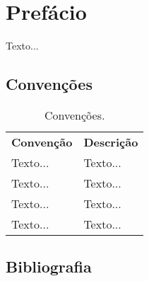 \section{Prefácio} %
\label{sec:prefácio}
\par Texto...
\subsection{Convenções} %


\begin{table}[h]
   \centering
    {\renewcommand\arraystretch{1.25}
       \caption{Convenções.}
       \vspace{0.3cm}
       \begin{tabular}{ l l }
         \cline{1-1}\cline{2-2}  
         \multicolumn{1}{|p{3.850cm}|}{\textbf{Convenção} \centering } &
         \multicolumn{1}{p{8cm}|}{\textbf{Descrição} \centering }
           \\  
           \cline{1-1}\cline{2-2}  
          \multicolumn{1}{|p{3.850cm}|}{\vspace{0.3cm} Texto... \centering } &
           \multicolumn{1}{p{8cm}|}{Texto... \centering }
             \\  
             \cline{1-1}\cline{2-2}  
             \multicolumn{1}{|p{3.850cm}|}{\vspace{0.4cm} Texto... \centering } &
             \multicolumn{1}{p{8cm}|}{Texto... \centering }
               \\  
               \cline{1-1}\cline{2-2}  
               \multicolumn{1}{|p{3.850cm}|}{\vspace{0.1cm} Texto... \centering } &
               \multicolumn{1}{p{8cm}|}{Texto... \centering } 
              \\
               \cline{1-1}\cline{2-2}
               \multicolumn{1}{|p{3.850cm}|}{\vspace{0.1cm} Texto... \centering } & 
               \multicolumn{1}{p{8cm}|}{Texto... \centering }
                \\
                   \hline
                   
               \end{tabular} }
             \end{table}
\label{sub:convenções}


\subsection{Bibliografia} %

